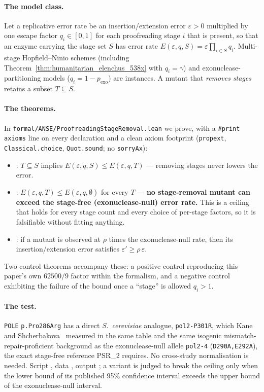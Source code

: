 \documentclass[11pt,a4paper]{article}
\theoremstyle{definition}
\begin{document}
\paragraph{The model class.} Let a replicative error rate be an insertion/extension error
$\varepsilon > 0$ multiplied by one escape factor $q_i \in [0,1]$ for each proofreading stage
$i$ that is present, so that an enzyme carrying the stage set $S$ has error rate
$E(\varepsilon, q, S) = \varepsilon \prod_{i \in S} q_i$. Multi-stage Hopfield--Ninio schemes
(including Theorem~\ref{thm:humanitarian_elenchus_538x} with $q_i = \gamma$) and
exonuclease-partitioning models ($q_i = 1 - p_{\mathrm{exo}}$) are instances. A mutant that
\emph{removes stages} retains a subset $T \subseteq S$.

\paragraph{The theorems.} In \texttt{formal/ANSE/ProofreadingStageRemoval.lean} we prove, with
a \texttt{\#print axioms} line on every declaration and a clean axiom footprint
(\texttt{propext}, \texttt{Classical.choice}, \texttt{Quot.sound}; no \texttt{sorryAx}):
\begin{itemize}
  \item {}: $T \subseteq S$ implies
    $E(\varepsilon,q,S) \le E(\varepsilon,q,T)$ --- removing stages never lowers the error.
  \item {}: $E(\varepsilon,q,T) \le E(\varepsilon,q,\emptyset)$
    for every $T$ --- \textbf{no stage-removal mutant can exceed the stage-free
    (exonuclease-null) error rate.} This is a ceiling that holds for every stage count and
    every choice of per-stage factors, so it is falsifiable without fitting anything.
  \item {}: if a mutant is observed at
    $\rho$ times the exonuclease-null rate, then its insertion/extension error satisfies
    $\varepsilon' \ge \rho\,\varepsilon$.
\end{itemize}
Two control theorems accompany these: a positive control reproducing this paper's own
$62500/9$ factor within the formalism, and a negative control exhibiting the failure of the
bound once a ``stage'' is allowed $q_i > 1$.

\paragraph{The test.} \texttt{POLE} \texttt{p.Pro286Arg} has a direct \emph{S.\ cerevisiae}
analogue, \texttt{pol2-P301R}, which Kane and Shcherbakova~\cite{kane2014} measured in the same
table and the same isogenic mismatch-repair-proficient background as the exonuclease-null
allele \texttt{pol2-4} (\texttt{D290A,E292A}), the exact stage-free reference PSR\_2 requires.
No cross-study normalisation is needed. Script
, data
, output
; a variant is judged to break the ceiling only
when the lower bound of its published 95\% confidence interval exceeds the upper bound of the
exonuclease-null interval.
\end{document}
